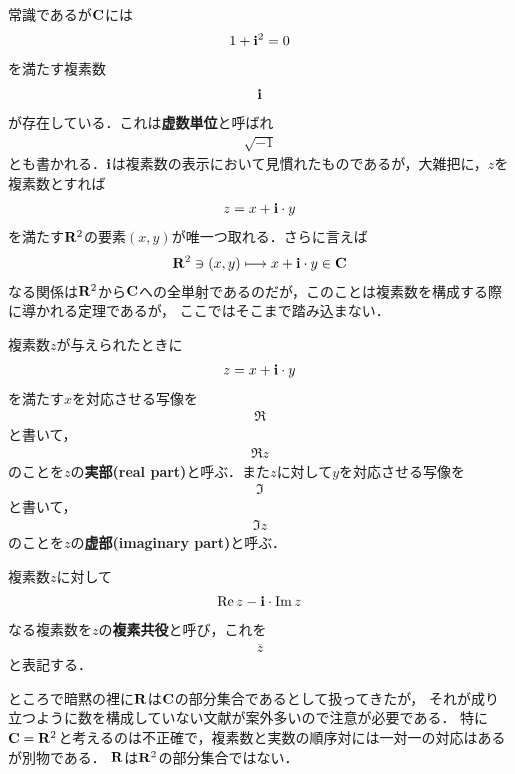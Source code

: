 	常識であるが$\mathbf{C}$には
	\begin{align}
		1 + \mathbf{i}^2 = 0
	\end{align}
	を満たす複素数
	\begin{align}
		\mathbf{i}
	\end{align}
	が存在している．これは{\bf 虚数単位}と呼ばれ
	\begin{align}
		\sqrt{-1}
	\end{align}
	とも書かれる．$\mathbf{i}$は複素数の表示において見慣れたものであるが，大雑把に，$z$を複素数とすれば
	\begin{align}
		z = x + \mathbf{i} \cdot y
	\end{align}
	を満たす$\mathbf{R}^2$の要素$(x,y)$が唯一つ取れる．さらに言えば
	\begin{align}
		\mathbf{R}^2 \ni (x,y) \longmapsto x + \mathbf{i} \cdot y \in \mathbf{C}
	\end{align}
	なる関係は$\mathbf{R}^2$から$\mathbf{C}$への全単射であるのだが，このことは複素数を構成する際に導かれる定理であるが，
	ここではそこまで踏み込まない．
	
	複素数$z$が与えられたときに
	\begin{align}
		z = x + \mathbf{i} \cdot y
	\end{align}
	を満たす$x$を対応させる写像を
	\begin{align}
		\Re
	\end{align}
	と書いて，
	\begin{align}
		\Re{z}
	\end{align}
	のことを$z$の{\bf 実部}{\bf (real part)}と呼ぶ．また$z$に対して$y$を対応させる写像を
	\begin{align}
		\Im
	\end{align}
	と書いて，
	\begin{align}
		\Im{z}
	\end{align}
	のことを$z$の{\bf 虚部}{\bf (imaginary part)}と呼ぶ．
	
	複素数$z$に対して
	\begin{align}
		\operatorname{Re} z - \mathbf{i} \cdot \operatorname{Im} z
	\end{align}
	なる複素数を$z$の{\bf 複素共役}と呼び，これを
	\begin{align}
		\overline{z}
	\end{align}
	と表記する．
	
	ところで暗黙の裡に$\mathbf{R}$は$\mathbf{C}$の部分集合であるとして扱ってきたが，
	それが成り立つように数を構成していない文献が案外多いので注意が必要である．
	特に$\mathbf{C} = \mathbf{R}^2$と考えるのは不正確で，複素数と実数の順序対には一対一の対応はあるが別物である．
	$\mathbf{R}$は$\mathbf{R}^2$の部分集合ではない．
	
